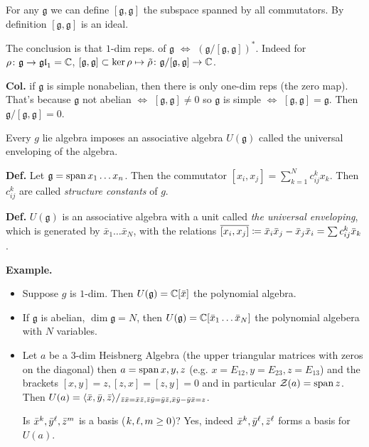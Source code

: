\documentclass[]{../../../../tex/classes/styledArticle}
\newcommand\gl {\mathfrak{gl}}
\newcommand\g  {\mathfrak{g}}
\begin{document}
	For any $\g$ we can define $[\g, \g]$ the subspace spanned by all commutators. By definition $[\g, \g]$ is an ideal. 
	
	The conclusion is that $1$-dim reps. of $\g$ $\iff$ $(\g / [\g, \g])^*$. Indeed for $\rho \co \g \to \gl_1 = \C$, $[\g, \g] \subset \ker \rho \mapsto \tl \rho \co \g/[\g, \g] \to \C$. 
	
	\textbf{Col. }if $\g$ is simple nonabelian, then there is only one-dim reps (the zero map). That's because $\g$ not abelian $\iff$ $[\g, \g] \neq 0$ so $\g$ is simple $\iff$ $[\g, \g] = \g$. Then $\g/[\g, \g] = 0$. 
	
	
	Every $g$ lie algebra imposes an associative algebra $U(\g)$ called {the universal enveloping }of the algebra. 
	
	\textbf{Def. }Let $\g = \Sp x_1 \dots x_n$. Then the commutator $[x_i, x_j] = \sum_{k = 1}^{N}c_{ij}^{k}x_k$. Then $c_{ij}^{k}$ are called \textit{structure constants} of $g$. 
	
	\renewcommand\UU {U}
	\textbf{Def. }$\UU(\g)$ is an associative algebra with a unit called \textit{the universal enveloping}, which is generated by $\bar x_1 \dots \bar x_N$, with the relations $\overline{[x_i, x_j]}\coloneqq \bar x_i \bar x_j - \bar x_j \bar x_i = \sum c_{ij}^{k}\bar x_k$. 
	
	\textbf{Example. }
	\begin{itemize}
		\item Suppose $g$ is $1$-dim. Then $\UU(\g) = \C[\bar x]$ the polynomial algebra. 
		\item If $\g$ is abelian, $\dim \g = N$, then $\UU(\g) = \C[\bar x_1 \dots \bar x_N]$ the polynomial algebera with $N$ variables. 
		\item Let $a$ be a $3$-dim Heisbnerg Algebra (the upper triangular matrices with zeros on the diagonal) then $a = \operatorname{span} x, y, z$ (e.g. $x = E_{12}, y = E_{23}, z= E_{13}$) and the brackets $[x, y] = z, [z, x] = [z, y] = 0$ and in particular $\mathcal{Z}(a) = \operatorname{span} z$. Then $\UU(a) = \la \bar x, \bar y, \bar z \ra / _{\bar z \bar x = \bar x \bar z, \bar z \bar y = \bar y \bar z, \bar x \bar y - \bar y \bar x = z}$. 
		
		Is $\bar x^{k}, \bar y^{\ell}, \bar z^{m}$ is a basis ($k, \ell, m \ge 0$)? Yes, indeed $\bar x^{k}, \bar y^{\ell}, \bar z^{\ell}$ forms a basis for $\UU(a)$. 
	\end{itemize}
	
\end{document}
